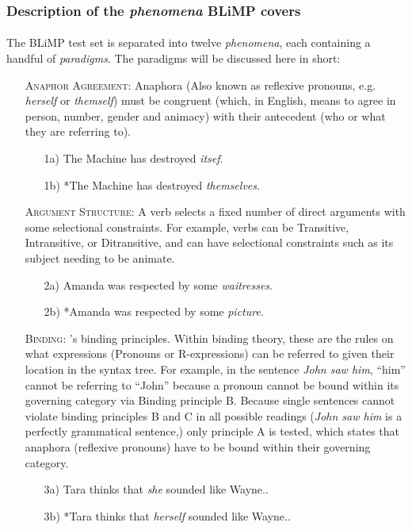 \documentclass[11pt]{article}
\begin{document}
\subsubsection{Description of the \textit{phenomena} BLiMP covers}
\paragraph{}
The BLiMP test set is separated into twelve \textit{phenomena}, each containing a handful of \textit{paradigms}. The paradigms will be discussed here in short:
\begin{itemize}
\item[] \textsc{Anaphor Agreement}: Anaphora (Also known as reflexive pronouns, e.g. \textit{herself} or \textit{themself}) must be congruent (which, in English, means to agree in person, number, gender and animacy) with their antecedent (who or what they are referring to).
    \begin{itemize}
        \item[1a)] The Machine has destroyed \textit{itsef}.
        \item[1b)] *The Machine has destroyed \textit{themselves}.
    \end{itemize}

\item[] \textsc{Argument Structure}: A verb selects a fixed number of direct arguments with some selectional constraints. For example, verbs can be Transitive, Intransitive, or Ditransitive, and can have selectional constraints such as its subject needing to be animate.
    \begin{itemize}
        \item[2a)] Amanda was respected by some \textit{waitresses}.
        \item[2b)] *Amanda was respected by some \textit{picture}.
    \end{itemize}

\item[] \textsc{Binding}: \textcite{chomsky1993lectures}'s binding principles. Within binding theory, these are the rules on what expressions (Pronouns or R-expressions) can be referred to given their location in the syntax tree. For example, in the sentence \textit{John saw him}, ``him'' cannot be referring to ``John'' because a pronoun cannot be bound within its governing category via Binding principle B. Because single sentences cannot violate binding principles B and C in all possible readings (\textit{John saw him} is a perfectly grammatical sentence,) only principle A is tested, which states that anaphora (reflexive pronouns) have to be bound within their governing category.
    \begin{itemize}
        \item[3a)] Tara thinks that \textit{she} sounded like Wayne..
        \item[3b)] *Tara thinks that \textit{herself} sounded like Wayne..
    \end{itemize}


\end{itemize}
\end{document}
